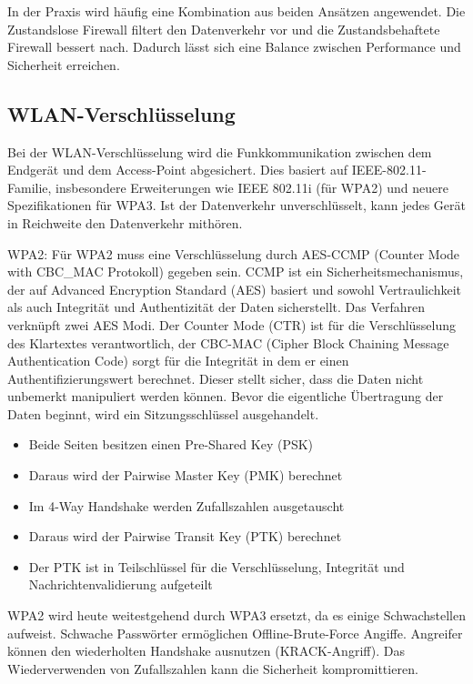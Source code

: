 	In der Praxis wird häufig eine Kombination aus beiden Ansätzen angewendet. Die Zustandslose Firewall filtert
	den Datenverkehr vor und die Zustandsbehaftete Firewall bessert nach. Dadurch lässt sich eine Balance
	zwischen Performance und Sicherheit erreichen. \cite{scarfone2009b}

	\subsection{WLAN-Verschlüsselung}
	\label{sec:WLAN-Verschlüsselung}
	Bei der WLAN-Verschlüsselung wird die Funkkommunikation zwischen dem Endgerät und dem 
	Access-Point abgesichert. Dies basiert auf IEEE-802.11-Familie, insbesondere Erweiterungen wie
	IEEE 802.11i (für WPA2) und neuere Spezifikationen für WPA3. Ist der Datenverkehr unverschlüsselt, 
	kann jedes Gerät in Reichweite den Datenverkehr mithören.

	WPA2: \newline
	Für WPA2 muss eine Verschlüsselung durch AES-CCMP (Counter Mode with CBC\_MAC Protokoll) gegeben sein.
	CCMP ist ein Sicherheitsmechanismus, der auf Advanced Encryption Standard (AES) basiert und sowohl
	Vertraulichkeit als auch Integrität und Authentizität der Daten sicherstellt.
	Das Verfahren verknüpft zwei AES Modi. Der Counter Mode (CTR) ist für die
	Verschlüsselung des Klartextes verantwortlich, der CBC-MAC (Cipher Block Chaining Message Authentication Code)
	sorgt für die Integrität in dem er einen Authentifizierungswert berechnet. Dieser stellt sicher,
	dass die Daten nicht unbemerkt manipuliert werden können. Bevor die eigentliche Übertragung der Daten
	beginnt, wird ein Sitzungsschlüssel ausgehandelt.
	\begin{itemize}
		\item{Beide Seiten besitzen einen Pre-Shared Key (PSK)}
		\item{Daraus wird der Pairwise Master Key (PMK) berechnet}
		\item{Im 4-Way Handshake werden Zufallszahlen ausgetauscht}
		\item{Daraus wird der Pairwise Transit Key (PTK) berechnet}
		\item{Der PTK ist in Teilschlüssel für die Verschlüsselung, Integrität und Nachrichtenvalidierung aufgeteilt}
	\end{itemize}
	WPA2 wird heute weitestgehend durch WPA3 ersetzt, da es einige Schwachstellen aufweist.
	Schwache Passwörter ermöglichen Offline-Brute-Force Angiffe. Angreifer können den wiederholten Handshake ausnutzen
	(KRACK-Angriff). Das Wiederverwenden von Zufallszahlen kann die Sicherheit kompromittieren.
	
